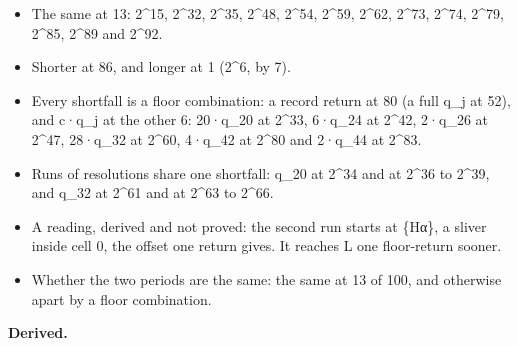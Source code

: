 \begin{itemize}
\begin{itemize}
\item The same at 13: 2\textasciicircum{}15, 2\textasciicircum{}32, 2\textasciicircum{}35, 2\textasciicircum{}48, 2\textasciicircum{}54, 2\textasciicircum{}59, 2\textasciicircum{}62, 2\textasciicircum{}73, 2\textasciicircum{}74, 2\textasciicircum{}79, 2\textasciicircum{}85, 2\textasciicircum{}89 and 2\textasciicircum{}92.
\item Shorter at 86, and longer at 1 (2\textasciicircum{}6, by 7).
\item Every shortfall is a floor combination: a record return at 80 (a full q\_\allowbreak{}j at 52), and c·q\_\allowbreak{}j at the other 6: 20·q\_\allowbreak{}20 at 2\textasciicircum{}33, 6·q\_\allowbreak{}24 at 2\textasciicircum{}42, 2·q\_\allowbreak{}26 at 2\textasciicircum{}47, 28·q\_\allowbreak{}32 at 2\textasciicircum{}60, 4·q\_\allowbreak{}42 at 2\textasciicircum{}80 and 2·q\_\allowbreak{}44 at 2\textasciicircum{}83.
\item Runs of resolutions share one shortfall: q\_\allowbreak{}20 at 2\textasciicircum{}34 and at 2\textasciicircum{}36 to 2\textasciicircum{}39, and q\_\allowbreak{}32 at 2\textasciicircum{}61 and at 2\textasciicircum{}63 to 2\textasciicircum{}66.
\item A reading, derived and not proved: the second run starts at \{Hα\}, a sliver inside cell 0, the offset one return gives. It reaches L one floor-return sooner.
\item Whether the two periods are the same: the same at 13 of 100, and otherwise apart by a floor combination.
\end{itemize}
\end{itemize}

\textbf{Derived.}

